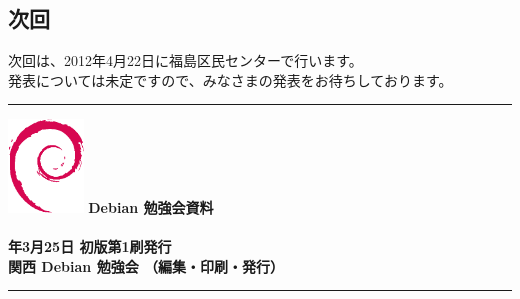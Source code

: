 \documentclass[mingoth,a4paper]{jsarticle}
\newcommand{\debmtgyear}{2012}
\newcommand{\debmtgdate}{25}
\newcommand{\debmtgmonth}{3}
\begin{document}
\clearpage
{}

\subsection{次回}

次回は、2012年4月22日に福島区民センターで行います。\\
発表については未定ですので、みなさまの発表をお待ちしております。


\printindex
 \cleartooddpage

 \begin{minipage}[b]{0.2\hsize}
 \end{minipage}
 \begin{minipage}[b]{0.8\hsize}

 \vspace*{15cm}
 \rule{\hsize}{1mm}
 \vspace{2mm}
 \includegraphics[width=2cm]{image200502/openlogo-nd.eps}
 \noindent \Large \bf Debian 勉強会資料\\ \\
 \noindent \normalfont \debmtgyear{}年\debmtgmonth{}月\debmtgdate{}日 \hspace{5mm}  初版第1刷発行\\
 \noindent \normalfont 関西 Debian 勉強会 （編集・印刷・発行）\\
 \rule{\hsize}{1mm}
 \end{minipage}
\end{document}
